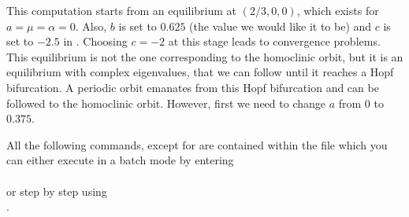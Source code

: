 \documentclass[12pt]{report}
\begin{document}
This computation starts from an equilibrium at $(2/3,0,0)$, which
exists for $a=\mu=\alpha=0$. Also, $b$ is set to $0.625$ (the value
we would like it to be) and $c$ is set to $-2.5$ in .
Choosing $c=-2$ at this stage leads to convergence problems.
This equilibrium is not the one corresponding to the homoclinic orbit,
but it is an equilibrium with complex eigenvalues, that we can follow
until it reaches a Hopf bifurcation. A periodic orbit emanates from 
this Hopf bifurcation and can be followed to the homoclinic orbit.
However, first we need to change $a$ from $0$ to $0.375$.

All the following commands, except for 
are contained within the file  which you can 
either execute in a batch mode by entering\\
\\
or step by step using\\
.
\end{document}
